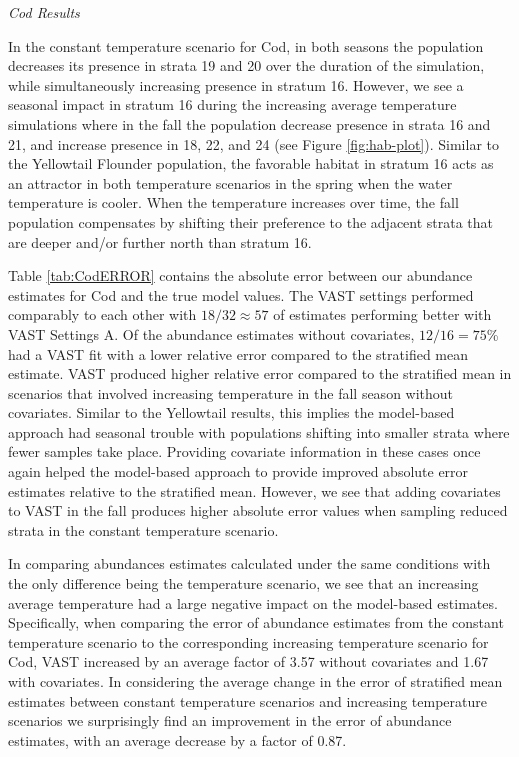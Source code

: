 \documentclass[
  12pt,
]{article}
\begin{document}
\emph{Cod Results}

In the constant temperature scenario for Cod, in both seasons the population decreases its presence in strata 19 and 20 over the duration of the simulation, while simultaneously increasing presence in stratum 16. However, we see a seasonal impact in stratum 16 during the increasing average temperature simulations where in the fall the population decrease presence in strata 16 and 21, and increase presence in 18, 22, and 24 (see Figure \ref{fig:hab-plot}). Similar to the Yellowtail Flounder population, the favorable habitat in stratum 16 acts as an attractor in both temperature scenarios in the spring when the water temperature is cooler. When the temperature increases over time, the fall population compensates by shifting their preference to the adjacent strata that are deeper and/or further north than stratum 16.

Table \ref{tab:CodERROR} contains the absolute error between our abundance estimates for Cod and the true model values. The VAST settings performed comparably to each other with \(18/32\approx57%
\) of estimates performing better with VAST Settings A. Of the abundance estimates without covariates, \(12/16=75\)\% had a VAST fit with a lower relative error compared to the stratified mean estimate. VAST produced higher relative error compared to the stratified mean in scenarios that involved increasing temperature in the fall season without covariates. Similar to the Yellowtail results, this implies the model-based approach had seasonal trouble with populations shifting into smaller strata where fewer samples take place. Providing covariate information in these cases once again helped the model-based approach to provide improved absolute error estimates relative to the stratified mean. However, we see that adding covariates to VAST in the fall produces higher absolute error values when sampling reduced strata in the constant temperature scenario.

In comparing abundances estimates calculated under the same conditions with the only difference being the temperature scenario, we see that an increasing average temperature had a large negative impact on the model-based estimates. Specifically, when comparing the error of abundance estimates from the constant temperature scenario to the corresponding increasing temperature scenario for Cod, VAST increased by an average factor of 3.57 without covariates and 1.67 with covariates. In considering the average change in the error of stratified mean estimates between constant temperature scenarios and increasing temperature scenarios we surprisingly find an improvement in the error of abundance estimates, with an average decrease by a factor of 0.87.
\end{document}
